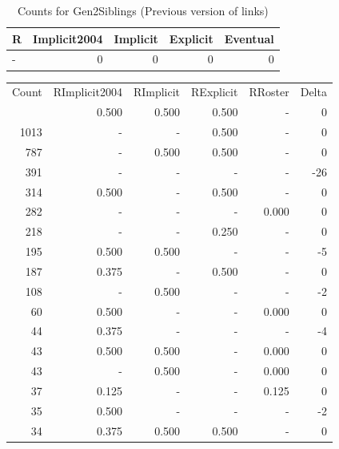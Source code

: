 \documentclass[a4paper]{article}\usepackage{graphicx, color}
\begin{document}
\begin{table}[ht]
\centering
{\large
\begin{tabular}{lrrrr}
  \hline
R & Implicit2004 & Implicit & Explicit & Eventual \\ 
  \hline
- &   0 &   0 &   0 &   0 \\ 
   \hline
\end{tabular}
}
\caption{Counts for Gen2Siblings (Previous version of links)} 
\end{table}



\begin{table}[ht]
\centering
\begin{tabular}{rrrrrr}
  \hline
Count & RImplicit2004 & RImplicit & RExplicit & RRoster & Delta \\ 
  \rowcolor{goodColor}  \hline
1192 & 0.500 & 0.500 & 0.500 & - & 0 \\ 
   \rowcolor{sosoColor} 1013 & - & - & 0.500 & - & 0 \\ 
   \rowcolor{goodColor} 787 & - & 0.500 & 0.500 & - & 0 \\ 
   \rowcolor{nullColor} 391 & - & - & - & - & -26 \\ 
   \rowcolor{sosoColor} 314 & 0.500 & - & 0.500 & - & 0 \\ 
   \rowcolor{nullColor} 282 & - & - & - & 0.000 & 0 \\ 
   \rowcolor{sosoColor} 218 & - & - & 0.250 & - & 0 \\ 
  195 & 0.500 & 0.500 & - & - & -5 \\ 
   \rowcolor{sosoColor} 187 & 0.375 & - & 0.500 & - & 0 \\ 
  108 & - & 0.500 & - & - & -2 \\ 
   \rowcolor{nullColor} 60 & 0.500 & - & - & 0.000 & 0 \\ 
   \rowcolor{nullColor} 44 & 0.375 & - & - & - & -4 \\ 
  43 & 0.500 & 0.500 & - & 0.000 & 0 \\ 
  43 & - & 0.500 & - & 0.000 & 0 \\ 
   \rowcolor{nullColor} 37 & 0.125 & - & - & 0.125 & 0 \\ 
   \rowcolor{nullColor} 35 & 0.500 & - & - & - & -2 \\ 
   \rowcolor{goodColor} 34 & 0.375 & 0.500 & 0.500 & - & 0 \\ 

\end{tabular}
\end{table}
\end{document}
